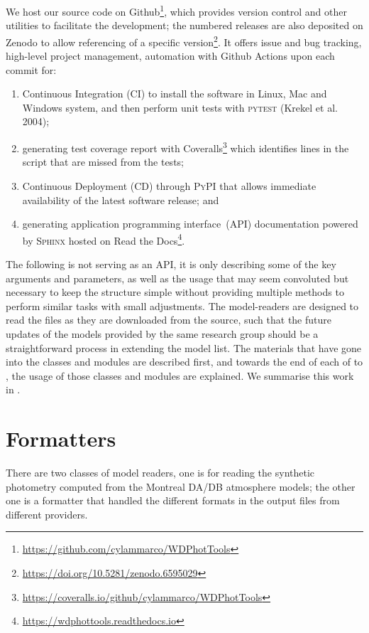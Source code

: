 \documentclass[fleqn,usenatbib]{rasti}
\begin{document}
We host our source code on Github\footnote{\url{https://github.com/cylammarco/WDPhotTools}},
which provides version control and other utilities to facilitate the
development; the numbered releases are also deposited on Zenodo to allow
referencing of a specific version\footnote{\url{https://doi.org/10.5281/zenodo.6595029}}. It offers issue and bug tracking, high-level project management,
automation with Github Actions upon each commit for:

\begin{enumerate}
    \item Continuous Integration (CI) to install the software in Linux, Mac
    and Windows system, and then perform unit tests with \textsc{pytest}
    (Krekel et al. 2004);
    \item generating test coverage report with Coveralls\footnote{\url{
    https://coveralls.io/github/cylammarco/WDPhotTools}}
    which identifies
    lines in the script that are missed from the tests;
    \item Continuous Deployment (CD) through \textsc{PyPI} that allows
    immediate availability of the latest software release; and
    \item generating application programming interface~(API) documentation
    powered by \textsc{Sphinx} hosted on
    Read the Docs\footnote{\url{https://wdphottools.readthedocs.io}}.
\end{enumerate}


The following is not serving as an API, it is only describing some of the key
arguments and parameters, as well as the usage that may seem convoluted but
necessary to keep the structure simple without providing multiple methods to
perform similar tasks with small adjustments. The model-readers are designed
to read the files as they are downloaded from the source, such that the future
updates of the models provided by the same research group should be a
straightforward process in extending the model list. The materials that have
gone into the classes and modules are described first, and towards the end of
each of  to , the usage of those classes and modules
are explained. We summarise this work in .

\section{Formatters}
There are two classes of model readers, one is for reading the synthetic
photometry computed from the Montreal DA/DB atmosphere models; the other one is
a formatter that handled the different formats in the output files from
different providers.
\end{document}
